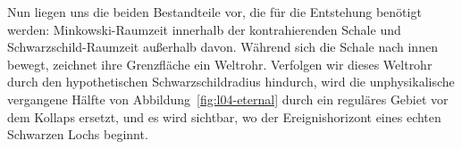 Nun liegen uns die beiden Bestandteile vor, die für die Entstehung benötigt werden: Minkowski-Raumzeit innerhalb der kontrahierenden Schale und Schwarzschild-Raumzeit außerhalb davon. Während sich die Schale nach innen bewegt, zeichnet ihre Grenzfläche ein Weltrohr. Verfolgen wir dieses Weltrohr durch den hypothetischen Schwarzschildradius hindurch, wird die unphysikalische vergangene Hälfte von Abbildung~\ref{fig:l04-eternal} durch ein reguläres Gebiet vor dem Kollaps ersetzt, und es wird sichtbar, wo der Ereignishorizont eines echten Schwarzen Lochs beginnt.
